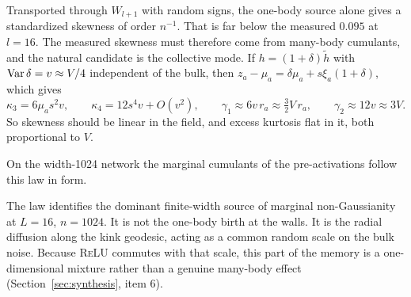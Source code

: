 \begin{remark}
Transported through $W_{l+1}$ with random signs, the one-body source alone gives a standardized skewness of order $n^{-1}$. That is far
below the measured $0.095$ at $l=16$. The measured skewness must therefore come from many-body cumulants, and the natural candidate
is the collective mode. If $h=(1+\delta)\tilde h$ with $\operatorname{Var}\delta=v\approx V/4$ independent of the bulk, then $z_a-\mu_a=\delta\mu_a+s\xi_a(1+\delta)$,
which gives
\[
\kappa_3=6\mu_as^2v,\qquad\kappa_4=12s^4v+O(v^2),\qquad\gamma_1\approx6v\,r_a\approx\tfrac32V\,r_a,\qquad\gamma_2\approx12v\approx3V.
\]
So skewness should be linear in the field, and excess kurtosis flat in it, both proportional to $V$.
\end{remark}
\begin{proposition}\label{prop:skewlaw}
On the width-1024 network the marginal cumulants of the pre-activations follow this law in form. 
\end{proposition}
The law identifies the dominant finite-width source of marginal non-Gaussianity at $L=16$, $n=1024$. It is not the one-body birth at
the walls. It is the radial diffusion along the kink geodesic, acting as a common random scale on the bulk noise. Because
\textsc{ReLU} commutes with that scale, this part of the memory is a one-dimensional mixture rather than a genuine many-body effect
(Section~\ref{sec:synthesis}, item 6).
